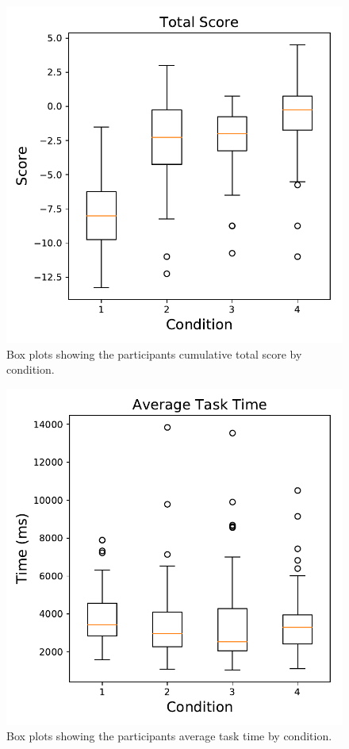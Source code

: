        \begin{figure}[tb]
            \centering
            \includegraphics[width=0.8\linewidth]{Figures/total_score_box.pdf}
            \caption{Box plots showing the participants cumulative total score by condition.}
            \label{fig:score_box}
       \end{figure}
       \begin{figure}[tb]
            \centering
            \includegraphics[width=0.8\linewidth]{Figures/avg_time_box.pdf}
            \caption{Box plots showing the participants average task time by condition.}
            \label{fig:time_box}
       \end{figure}
